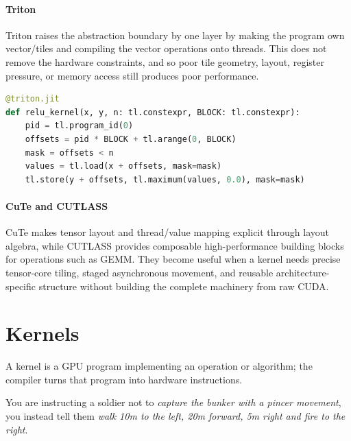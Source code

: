 \paragraph{Triton}
Triton raises the abstraction boundary by one layer by making the program own vector/tiles and compiling the vector operations onto threads.
This does not remove the hardware constraints, and so poor tile geometry, layout, register pressure, or memory access still produces poor performance.

\begin{lstlisting}[language=Python,caption={Triton exposes program instances, vector offsets, masks, and compile-time tile parameters.},label={lst:triton-kernel}]
@triton.jit
def relu_kernel(x, y, n: tl.constexpr, BLOCK: tl.constexpr):
    pid = tl.program_id(0)
    offsets = pid * BLOCK + tl.arange(0, BLOCK)
    mask = offsets < n
    values = tl.load(x + offsets, mask=mask)
    tl.store(y + offsets, tl.maximum(values, 0.0), mask=mask)
\end{lstlisting}

\paragraph{CuTe and CUTLASS}
CuTe makes tensor layout and thread/value mapping explicit through layout algebra, while CUTLASS provides composable high-performance building blocks for operations such as GEMM.
They become useful when a kernel needs precise tensor-core tiling, staged asynchronous movement, and reusable architecture-specific structure without building the complete machinery from raw CUDA.


\section{Kernels}
\label{sec:hardware-kernels}
A kernel is a GPU program implementing an operation or algorithm; the compiler turns that program into hardware instructions.

You are instructing a soldier not to \textit{capture the bunker with a pincer movement}, you instead tell them \textit{walk 10m to the left, 20m forward, 5m right and fire to the right}. 

